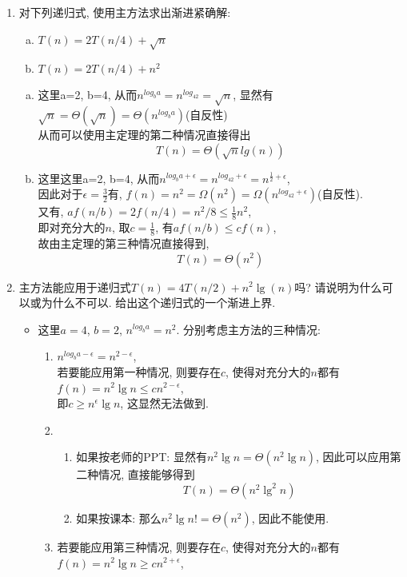 \documentclass[UTF8]{article}
\begin{document}
\begin{enumerate}[1.]
\item 对下列递归式, 使用主方法求出渐进紧确解:
	\begin{enumerate}[(a). ]
	\item $T(n)=2T(n/4)+\sqrt{n}$
	\item $T(n)=2T(n/4)+n^2$
	\end{enumerate}
	\begin{enumerate}[(a). ]
	\item 这里a=2, b=4, 从而$n^{log_ba}=n^{log_42}=\sqrt{n}$, 显然有$\sqrt{n}=\Theta(\sqrt{n})=\Theta(n^{log_ba})$(自反性)\\
		从而可以使用主定理的第二种情况直接得出$$T(n)=\Theta(\sqrt{n}lg(n))$$
	\item 这里这里a=2, b=4, 从而$n^{log_ba+\epsilon}=n^{log_42+\epsilon}=n^{\frac{1}{2}+\epsilon}$,\\
		因此对于$\epsilon=\frac{3}{2}$有, $f(n)=n^2=\Omega(n^2)=\Omega(n^{log_42+\epsilon})$(自反性).\\
		又有, $af(n/b)=2f(n/4)=n^2/8\le\frac{1}{8}n^2$, \\
		即对充分大的$n$, 取$c=\frac{1}{8}$, 有$af(n/b)\le cf(n)$,\\
		故由主定理的第三种情况直接得到, $$T(n)=\Theta(n^2)$$
	\end{enumerate}
\item 主方法能应用于递归式$T(n)=4T(n/2)+n^2\lg(n)$吗? 请说明为什么可以或为什么不可以. 给出这个递归式的一个渐进上界.
	\begin{itemize}
	\item 这里$a=4$, $b=2$, $n^{log_ba}=n^2$. 分别考虑主方法的三种情况:
		\begin{enumerate}[(1). ]
		\item $n^{log_ba-\epsilon}=n^{2-\epsilon}$, \\若要能应用第一种情况, 则要存在$c$, 使得对充分大的$n$都有$f(n)=n^2\lg n\le cn^{2-\epsilon}$,\\
			即$c\ge n^\epsilon \lg n$, 这显然无法做到.
		\item 
			\begin{enumerate}
			\item 如果按老师的PPT: 显然有$n^2\lg n=\Theta(n^2\lg n)$, 因此可以应用第二种情况, 直接能够得到
			$$T(n)=\Theta(n^2\lg^2n)$$
			\item 如果按课本: 那么$n^2\lg n!=\Theta(n^2)$, 因此不能使用.
			\end{enumerate}
		\item 若要能应用第三种情况, 则要存在$c$, 使得对充分大的$n$都有$f(n)=n^2\lg n\ge cn^{2+\epsilon}$,\\

\end{enumerate}
\end{itemize}
\end{enumerate}
\end{document}
